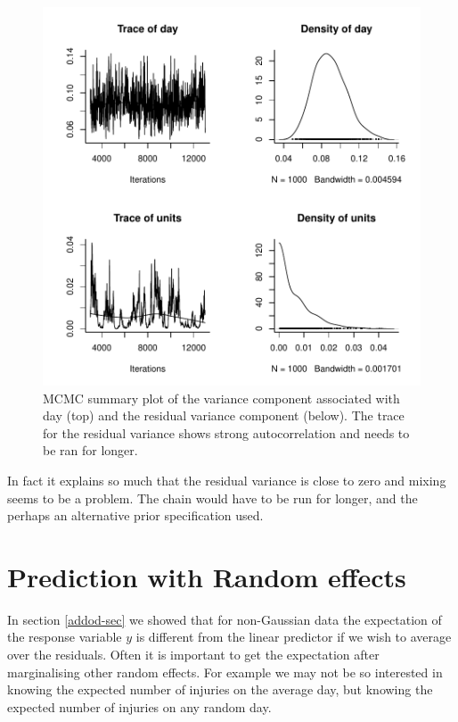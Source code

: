 \documentclass{article}
\begin{document}
\begin{figure}[!h]
\begin{center}
\includegraphics{Lecture2-055}
\end{center}
\caption{MCMC summary plot of the variance component associated with day (top) and the residual variance component (below). The trace for the residual variance shows strong autocorrelation and needs to be ran for longer.}
\label{GLMM.VCV-fig}
\end{figure}

In fact it explains so much that the residual variance is close to zero and mixing seems to be a problem. The chain would have to be run for longer, and the perhaps an alternative prior specification used.

\section{Prediction with Random effects}
\label{pred-sec}

In section \ref{addod-sec} we showed that for non-Gaussian data the expectation of the response variable $y$ is different from the linear predictor if we wish to average over the residuals. Often it is important to get the expectation after marginalising other random effects. For example we may not be so interested in knowing the expected number of injuries on the average day, but knowing the expected number of injuries on any random day. \\  
\end{document}
